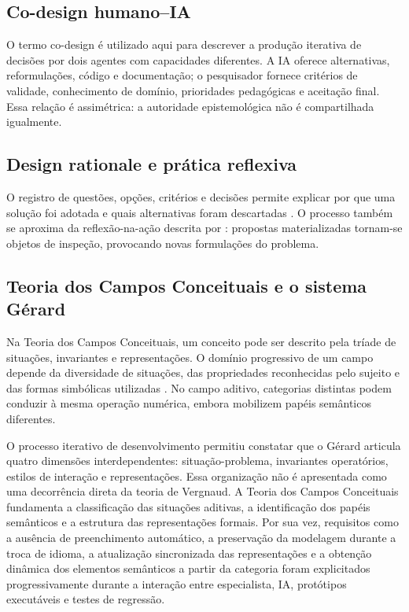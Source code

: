 \documentclass[preprint,12pt,authoryear]{elsarticle}
\newcommand{\gerard}{Gérard\xspace}
\begin{document}
\subsection{Co-design humano--IA}
O termo co-design é utilizado aqui para descrever a produção iterativa de decisões por dois agentes com capacidades diferentes. A IA oferece alternativas, reformulações, código e documentação; o pesquisador fornece critérios de validade, conhecimento de domínio, prioridades pedagógicas e aceitação final. Essa relação é assimétrica: a autoridade epistemológica não é compartilhada igualmente.

\subsection{Design rationale e prática reflexiva}
O registro de questões, opções, critérios e decisões permite explicar por que uma solução foi adotada e quais alternativas foram descartadas \citep{macleam1991qoc}. O processo também se aproxima da reflexão-na-ação descrita por \citet{schon1983reflective}: propostas materializadas tornam-se objetos de inspeção, provocando novas formulações do problema.

\subsection{Teoria dos Campos Conceituais e o sistema Gérard}
Na Teoria dos Campos Conceituais, um conceito pode ser descrito pela tríade de situações, invariantes e representações. O domínio progressivo de um campo depende da diversidade de situações, das propriedades reconhecidas pelo sujeito e das formas simbólicas utilizadas \citep{vergnaud1990theorie,vergnaud1997nature}. No campo aditivo, categorias distintas podem conduzir à mesma operação numérica, embora mobilizem papéis semânticos diferentes.

O processo iterativo de desenvolvimento permitiu constatar que o \gerard articula quatro dimensões interdependentes: situação-problema, invariantes operatórios, estilos de interação e representações. Essa organização não é apresentada como uma decorrência direta da teoria de Vergnaud. A Teoria dos Campos Conceituais fundamenta a classificação das situações aditivas, a identificação dos papéis semânticos e a estrutura das representações formais. Por sua vez, requisitos como a ausência de preenchimento automático, a preservação da modelagem durante a troca de idioma, a atualização sincronizada das representações e a obtenção dinâmica dos elementos semânticos a partir da categoria foram explicitados progressivamente durante a interação entre especialista, IA, protótipos executáveis e testes de regressão.
\end{document}
